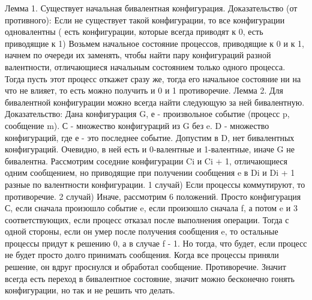Лемма 1. Существует начальная бивалентная конфигурация.
Доказательство (от противного):
Если не существует такой конфигурации, то все конфигурации одновалентны ( есть конфигурации, которые всегда приводят к 0, есть приводящие к 1)
Возьмем начальное состояние процессов, приводящие к 0 и к 1, начнем по очереди их заменять, чтобы найти пару конфигураций разной валентности, отличающиеся начальным состоянием только одного процесса.
Тогда пусть этот процесс откажет сразу же, тогда его начальное состояние ни на что не влияет, то есть можно получить и 0 и 1 противоречие.
Лемма 2. Для бивалентной конфигурации можно всегда найти следующую за ней бивалентную.
Доказательство:
Дана конфигурация G, е - произвольное событие (процесс p, сообщение m).
С - множество конфигураций из G без e.
D - множество конфигураций, где е - это последнее событие.
Допустим в D, нет бивалентных конфигураций.
Очевидно, в ней есть и 0-валентные и 1-валентные, иначе G не бивалентна.
Рассмотрим соседние конфигурации Ci и Ci + 1, отличающиеся одним сообщением, но приводящие при получении сообщения e в Di и Di + 1 разные по валентности конфигурации.
1 случай) Если процессы коммутируют, то противоречие.
2 случай) Иначе, рассмотрим 6 положений. Просто конфигурация С, если сначала произошло событие e, если произошло сначала f, а потом e и 3 соответствующих, если процесс отказал после выполнения операции.
Тогда с одной стороны, если он умер после получения сообщения e, то остальные процессы придут к решению 0, а в случае f -  1. Но тогда, что будет, если процесс не будет просто долго принимать сообщения. Когда все процессы приняли решение, он вдруг проснулся и обработал сообщение. Противоречие.
Значит всегда есть переход в бивалентное состояние, значит можно бесконечно гонять конфигурации, но так и не решить что делать.